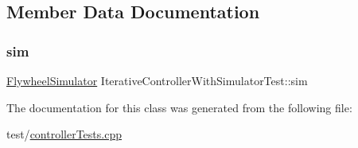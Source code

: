 \subsection{Member Data Documentation}
\mbox{\label{classIterativeControllerWithSimulatorTest_ac1ee29525f6b291fed101f83733712b4}} 
\subsubsection{\texorpdfstring{sim}{sim}}
{\footnotesize\ttfamily \mbox{\hyperlink{classokapi_1_1FlywheelSimulator}{Flywheel\+Simulator}} Iterative\+Controller\+With\+Simulator\+Test\+::sim\hspace{0.3cm}{\ttfamily [protected]}}



The documentation for this class was generated from the following file\+:\begin{DoxyCompactItemize}
\item 
test/\mbox{\hyperlink{test_2controllerTests_8cpp}{controller\+Tests.\+cpp}}\end{DoxyCompactItemize}
